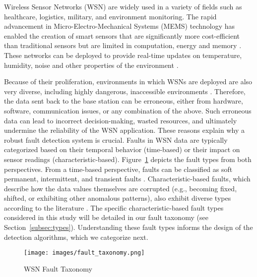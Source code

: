 Wireless Sensor Networks (WSN) are widely used in a variety of fields such as healthcare, logistics, military, and environment monitoring. The rapid advancement in Micro-Electro-Mechanical Systems (MEMS) technology has enabled the creation of smart sensors that are significantly more cost-efficient than traditional sensors but are limited in computation, energy and memory \cite{Yick2008, Chai2020, Hussain2021}. These networks can be deployed to provide real-time updates on temperature, humidity, noise and other properties of the environment \cite{Yick2008, Chai2020, Ullo2020}.

Because of their proliferation, environments in which WSNs are deployed are also very diverse, including highly dangerous, inaccessible environments \cite{Prasad2023}. Therefore, the data sent back to the base station can be erroneous, either from hardware, software, communication issues, or any combination of the above. Such erroneous data can lead to incorrect decision-making, wasted resources, and ultimately undermine the reliability of the WSN application. These reasons explain why a robust fault detection system is crucial. Faults in WSN data are typically categorized based on their temporal behavior (time-based) or their impact on sensor readings (characteristic-based). Figure~\ref{fig:types} depicts the fault types from both perspectives. From a time-based perspective, faults can be classified as soft permanent, intermittent, and transient faults \cite{Prasad2023}. Characteristic-based faults, which describe how the data values themselves are corrupted (e.g., becoming fixed, shifted, or exhibiting other anomalous patterns), also exhibit diverse types according to the literature \cite{Shi2024, Saeed2021, Ni2009, Hasan2024}. The specific characteristic-based fault types considered in this study will be detailed in our fault taxonomy (see Section~\ref{subsec:types}). Understanding these fault types informs the design of the detection algorithms, which we categorize next.

\begin{figure}
  \centering
  \texttt{[image: images/fault\_taxonomy.png]}
  \caption{WSN Fault Taxonomy}
  \label{fig:types}
\end{figure}

